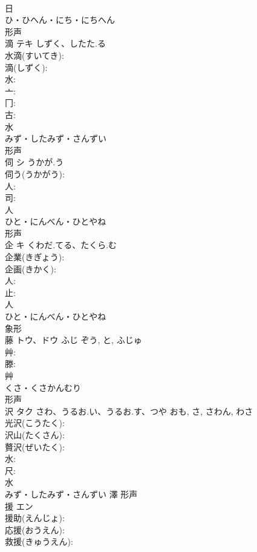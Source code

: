 \documentclass[8pt]{extreport}
\begin{document}
\begin{CJK}{UTF8}{min}
\\	日	
\\	ひ・ひへん・にち・にちへん	
\\	形声 
\\	滴	テキ	しずく、したた.る		
\\	水滴(すいてき): 
\\	滴(しずく): 
\\	水: 
\\	亠: 
\\	冂: 
\\	古: 
\\	水	
\\	みず・したみず・さんずい	
\\	形声 
\\	伺	シ	うかが.う		
\\	伺う(うかがう): 
\\	人: 
\\	司: 
\\	人	
\\	ひと・にんべん・ひとやね	
\\	形声 
\\	企	キ	くわだ.てる、たくら.む		
\\	企業(きぎょう): 
\\	企画(きかく): 
\\	人: 
\\	止: 
\\	人	
\\	ひと・にんべん・ひとやね	
\\	象形 
\\	藤	トウ、ドウ	ふじ	ぞう, と, ふじゅ	
\\	艸: 
\\	滕: 
\\	艸	
\\	くさ・くさかんむり	
\\	形声 
\\	沢	タク	さわ、うるお.い、うるお.す、つや	おも, さ, さわん, わさ	
\\	光沢(こうたく): 
\\	沢山(たくさん): 
\\	贅沢(ぜいたく): 
\\	水: 
\\	尺: 
\\	水	
\\	みず・したみず・さんずい	澤	形声 
\\	援	エン			
\\	援助(えんじょ): 
\\	応援(おうえん): 
\\	救援(きゅうえん): 

\end{CJK}
\end{document}
